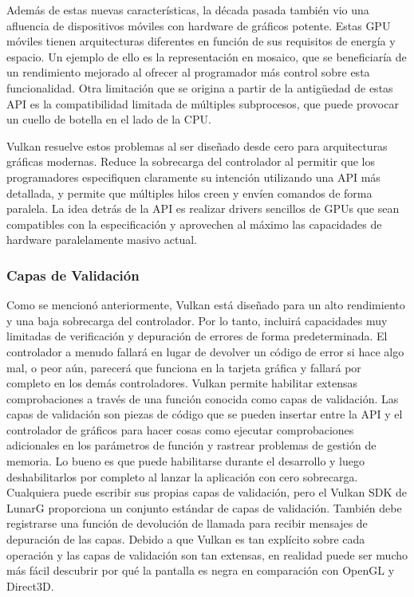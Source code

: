 \documentclass[a4paper, 17pt]{book}
\begin{document}
\vspace{1mm} %

Además de estas nuevas características, la década pasada también vio una afluencia de dispositivos móviles con hardware
de gráficos potente. Estas GPU móviles tienen arquitecturas diferentes en función de sus requisitos de energía y espacio.
Un ejemplo de ello es la representación en mosaico, que se beneficiaría de un rendimiento mejorado al ofrecer al
programador más control sobre esta funcionalidad. Otra limitación que se origina a partir de la antigüedad de estas API
es la compatibilidad limitada de múltiples subprocesos, que puede provocar un cuello de botella en el lado de la CPU.

\vspace{1mm} %

Vulkan resuelve estos problemas al ser diseñado desde cero para arquitecturas gráficas modernas. Reduce la sobrecarga
del controlador al permitir que los programadores especifiquen claramente su intención utilizando una API más detallada,
y permite que múltiples hilos creen y envíen comandos de forma paralela. La idea detrás de la API es realizar drivers
sencillos de GPUs que sean compatibles con la especificación y aprovechen al máximo las capacidades de hardware paralelamente
masivo actual.

\subsubsection{Capas de Validación} 
\label{subsec:CapsVulkan}

Como se mencionó anteriormente, Vulkan está diseñado para un alto rendimiento y una baja sobrecarga del controlador.
Por lo tanto, incluirá capacidades muy limitadas de verificación y depuración de errores de forma predeterminada.
El controlador a menudo fallará en lugar de devolver un código de error si hace algo mal, o peor aún, parecerá que
funciona en la tarjeta gráfica y fallará por completo en los demás controladores.
Vulkan permite habilitar extensas comprobaciones a través de una función conocida como capas de validación.
Las capas de validación son piezas de código que se pueden insertar entre la API y el controlador de gráficos
para hacer cosas como ejecutar comprobaciones adicionales en los parámetros de función y rastrear problemas
de gestión de memoria. Lo bueno es que puede habilitarse durante el desarrollo y luego deshabilitarlos por
completo al lanzar la aplicación con cero sobrecarga. Cualquiera puede escribir sus propias capas de validación,
pero el Vulkan SDK de LunarG proporciona un conjunto estándar de capas de validación. También debe registrarse
una función de devolución de llamada para recibir mensajes de depuración de las capas.
Debido a que Vulkan es tan explícito sobre cada operación y las capas de validación son tan extensas, en realidad
puede ser mucho más fácil descubrir por qué la pantalla es negra en comparación con OpenGL y Direct3D.
\end{document}
